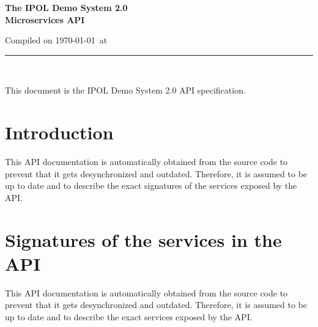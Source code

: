 \documentclass[a4paper,12pt]{article}
\begin{document}
\begin{titlepage}

\begin{center}
\vspace*{-1in}

\vspace*{0.6in}
\begin{Large}
\textbf{The IPOL Demo System 2.0 \\Microservices API} \\
\end{Large}

\vspace*{0.6in}

\small{Compiled on \today\ at \currenttime}

\vspace*{0.6in}
\rule{80mm}{0.1mm}\\
\vspace*{0.1in}
\end{center}

\end{titlepage}

This document is the IPOL Demo System 2.0 API specification.

\newpage

\tableofcontents
\newpage

\section{Introduction}
\label{sec:introduction}
This API documentation is automatically obtained from the source code to prevent that it gets desynchronized and outdated.
Therefore, it is assumed to be up to date and to describe the exact signatures of the services exposed by the API.


\section{Signatures of the services in the API}
\label{sec:Docstring}
This API documentation is automatically obtained from the source code to prevent that it gets desynchronized and outdated.
Therefore, it is assumed to be up to date and to describe the exact services exposed by the API.


\end{document}
